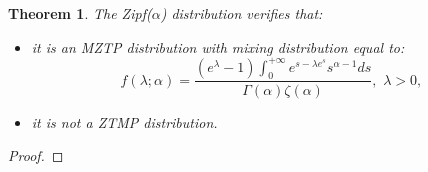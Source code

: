 \documentclass{article}
\newtheorem{theorem}{Theorem}%
\begin{document}
\begin{theorem} \label{prop:teorema2}
The Zipf($\alpha$) distribution verifies that: 
	\begin{itemize}
		\item[a)] it is an MZTP distribution with mixing distribution equal to:
		\begin{equation} \label{eq:mixingzipf}
		f(\lambda; \alpha)=   \frac{(e^{\lambda}-1) \int_0^{+\infty}   e^{s-\lambda e^{s}}  s^{\alpha-1} ds }{\Gamma(\alpha) \zeta(\alpha) },\,\, \lambda>0,
		\end{equation}
		\item[b)] it is not a ZTMP distribution.
	\end{itemize} 
\end{theorem}
\begin{proof}


\end{proof}
\end{document}
